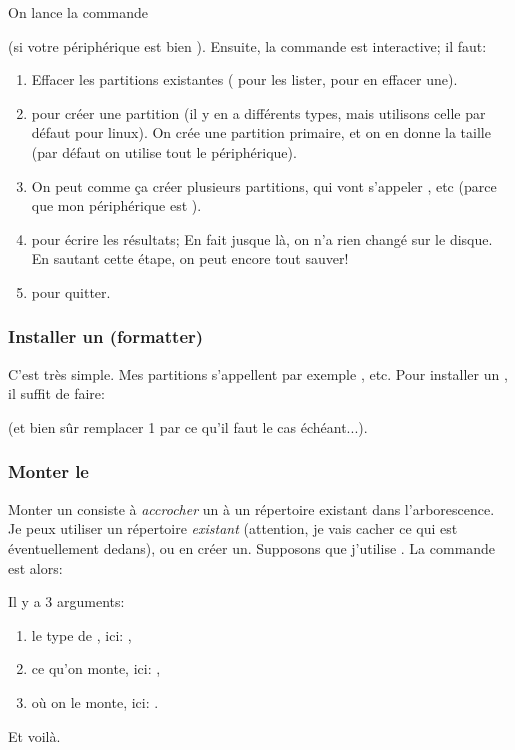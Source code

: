 On lance la commande

 (si votre périphérique est bien
). Ensuite, la commande est interactive; 
il faut:
\begin{enumerate}
  \item Effacer les partitions existantes ( pour les lister,
     pour en effacer une).
  \item {} pour créer une partition (il y en a différents types,
    mais utilisons celle par défaut pour linux). On crée une partition primaire,
    et on en donne la taille (par défaut on utilise tout le périphérique).
   \item On peut comme ça créer plusieurs partitions, qui vont
     s'appeler ,  etc (parce que mon
     périphérique est ).
   \item {} pour écrire les résultats; En fait jusque là, on n'a
     rien changé sur le disque. En sautant cette étape, on peut encore
     tout sauver!
   \item {} pour quitter.
\end{enumerate}
\subsubsection{Installer un  \sff{} (formatter)}
C'est très simple. Mes partitions s'appellent par exemple
,  etc. Pour installer un \sff{}
  , il suffit de faire:

   (et bien sûr remplacer 1 par ce qu'il
  faut le cas échéant...).

\subsubsection{Monter le \sff{}}


Monter un \sff{} consiste à \emph{accrocher} un \sff{} à un
répertoire existant 
dans l'arborescence. Je peux utiliser un répertoire \emph{existant}
(attention, je vais cacher ce qui est éventuellement dedans), ou en
créer un. Supposons que j'utilise . La commande est alors:


Il y a 3 arguments:
\begin{enumerate}
\item le type de \sff, ici: ,
\item ce qu'on monte, ici: ,
\item où on le monte, ici:  .
\end{enumerate}
Et voilà.

